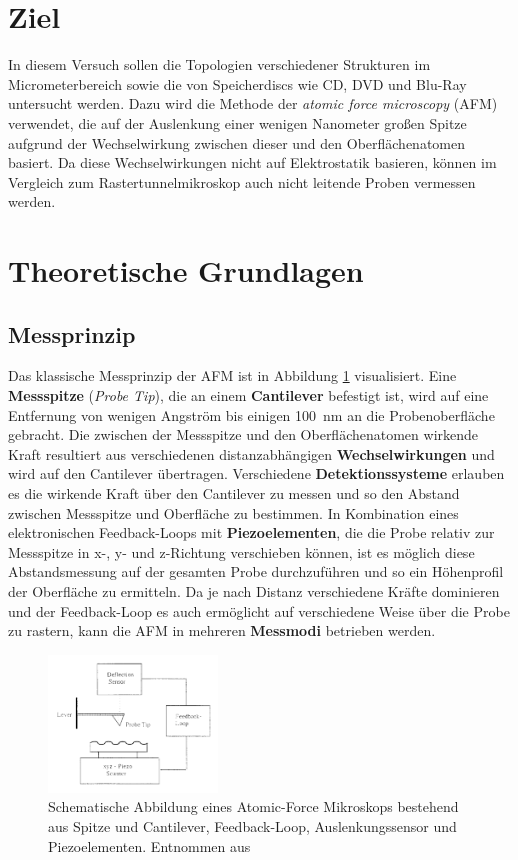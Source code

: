 \section{Ziel}
    In diesem Versuch sollen die Topologien verschiedener Strukturen im Micrometerbereich sowie die von Speicherdiscs wie CD, DVD und Blu-Ray untersucht werden. Dazu wird die Methode der \textit{atomic force
    microscopy} (AFM) verwendet, die auf der Auslenkung einer wenigen Nanometer großen Spitze aufgrund der Wechselwirkung zwischen dieser und den Oberflächenatomen basiert. Da diese Wechselwirkungen nicht
    auf Elektrostatik basieren, können im Vergleich zum Rastertunnelmikroskop auch nicht leitende Proben vermessen werden.    
    
\section{Theoretische Grundlagen}
    \subsection{Messprinzip}
        Das klassische Messprinzip der AFM ist in Abbildung \ref{fig:prinzip} visualisiert. Eine \textbf{Messspitze} (\textit{Probe Tip}), die an einem \textbf{Cantilever} befestigt ist, wird auf eine 
        Entfernung von wenigen Angström bis einigen \SI{100}{\nano\metre} an die Probenoberfläche gebracht. Die zwischen der Messspitze und den Oberflächenatomen wirkende Kraft resultiert aus verschiedenen
        distanzabhängigen \textbf{Wechselwirkungen} und wird auf den Cantilever übertragen. Verschiedene \textbf{Detektionssysteme} erlauben es die wirkende Kraft über den Cantilever zu messen und so den 
        Abstand zwischen Messspitze und Oberfläche zu bestimmen. In Kombination eines elektronischen Feedback-Loops mit \textbf{Piezoelementen}, die die Probe relativ zur Messspitze in x-, y- und z-Richtung
        verschieben können, ist es möglich diese Abstandsmessung auf der gesamten Probe durchzuführen und so ein Höhenprofil der Oberfläche zu ermitteln. Da je nach Distanz verschiedene Kräfte dominieren und
        der Feedback-Loop es auch ermöglicht auf verschiedene Weise über die Probe zu rastern, kann die AFM in mehreren \textbf{Messmodi} betrieben werden.

        \FloatBarrier

        \begin{figure}[h]
          \centering
          \includegraphics[width = 0.4\textwidth]{pictures/prinzip.png}
          \caption{Schematische Abbildung eines Atomic-Force Mikroskops bestehend aus Spitze und Cantilever, Feedback-Loop, Auslenkungssensor und Piezoelementen. Entnommen aus \cite{meyer_atomic_1992}}
          \label{fig:prinzip}
        \end{figure}
    
